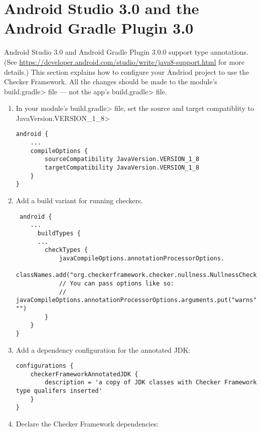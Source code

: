 \section{Android Studio 3.0 and the Android Gradle Plugin 3.0\label{android-gradle}}

Android Studio 3.0 and Android Gradle Plugin 3.0.0 support type
annotations.  (See
\url{https://developer.android.com/studio/write/java8-support.html}
for more details.)  This section explains how to configure your Andriod
project to use the Checker Framework.  All the changes should be made to
the module's \<build.gradle> file --- not the app's \<build.gradle> file.

\begin{enumerate}

\item In your module's \<build.gradle> file, set the source and target
  compatiblity to \<JavaVersion.VERSION\_1\_8>

\begin{Verbatim}
android {
    ...
    compileOptions {
        sourceCompatibility JavaVersion.VERSION_1_8
        targetCompatibility JavaVersion.VERSION_1_8
    }
}
\end{Verbatim}

\item Add a build variant for running checkers.

 \begin{Verbatim}
 android {
    ...
      buildTypes {
      ...
        checkTypes {
            javaCompileOptions.annotationProcessorOptions.
                    classNames.add("org.checkerframework.checker.nullness.NullnessChecker")
            // You can pass options like so:
            // javaCompileOptions.annotationProcessorOptions.arguments.put("warns", "")
        }
    }
}
\end{Verbatim}

\item Add a dependency configuration for the annotated JDK:

\begin{mysmall}
\begin{Verbatim}
configurations {
    checkerFrameworkAnnotatedJDK {
        description = 'a copy of JDK classes with Checker Framework type qualifers inserted'
    }
}

\end{Verbatim}
\end{mysmall}

\item Declare the Checker Framework dependencies:


\end{enumerate}
